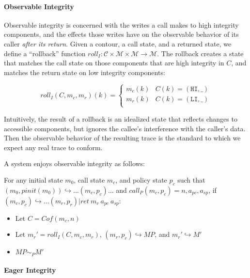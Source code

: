 \documentclass[conference]{IEEEtran}
\newcommand{\MP}{\mathit{MP}}
\begin{document}
    \paragraph{Observable Integrity}

      Observable integrity is concerned with the writes a call makes to high integrity components,
      and the effects those writes have on the observable behavior of its caller
      {\it after its return}. Given a contour, a call state, and a returned state, we define
      a ``rollback'' function \(\mathit{roll}_I : \mathcal{C} \times \mathcal{M} \times \mathcal{M}
      \rightarrow \mathcal{M}\). The rollback creates a state that matches the call
      state on those components that are high integrity in \(C\), and matches the return state
      on low integrity components:

      \[\mathit{roll}_I(C,m_c,m_r)(k) =
      \begin{cases}
        m_c(k) & C(k) = (\mathtt{HI},\_) \\
        m_r(k) & C(k) = (\mathtt{LI},\_) \\
      \end{cases}\]

      Intuitively, the result of a rollback is an idealized state that reflects changes to accessible
      components, but ignores the callee's interference with the caller's data. Then the observable
      behavior of the resulting trace is the standard to which we expect any real trace to conform.

      A system enjoys observable integrity as follows:

      For any initial state \(m_0\), call state \(m_c\), and policy state \(p_c\) such that
      \((m_0,\mathit{pinit}(m_0)) \hookrightarrow ... (m_c,p_c) ...\)
      and \(\mathit{call}_P(m_c,p_c) = n,a_{pc},a_{sp}\), if 
      \((m_c,p_c) \hookrightarrow ... (m_r,p_r) | \mathit{ret}\ m_r\ a_{pc}\ a_{sp}\):

          \begin{itemize}
            \item Let \(C = \mathit{Cof}(m_c,n)\)
            \item Let \(m_r' = \mathit{roll}_I(C,m_c,m_r)\), \((m_r,p_r) \hookrightarrow \MP\), and
              \(m_r' \hookrightarrow M'\)
            \item \(\MP \sim_P M'\)
          \end{itemize}

    \paragraph{Eager Integrity}
 
\end{document}
